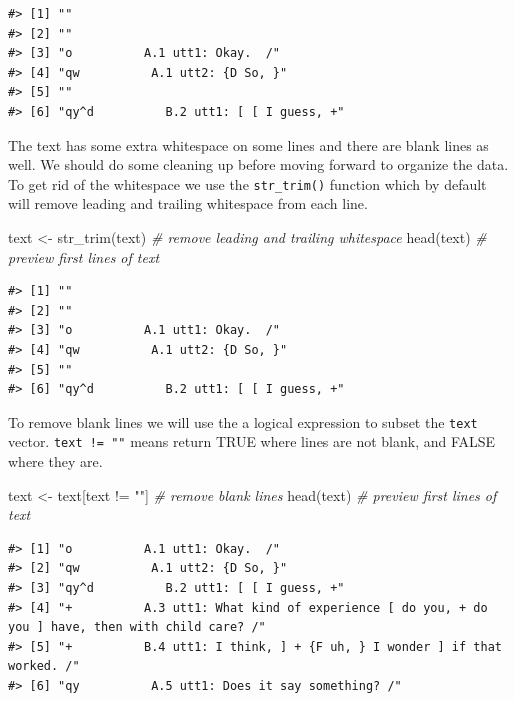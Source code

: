 \documentclass[
  letterpaper,
]{scrbook}
\newenvironment{Shaded}{\begin{snugshade}}{\end{snugshade}}
\newcommand{\CommentTok}[1]{\textcolor[rgb]{0.00,0.00,0.00}{\textit{#1}}}
\newcommand{\FunctionTok}[1]{\textcolor[rgb]{0.00,0.00,0.00}{#1}}
\newcommand{\NormalTok}[1]{\textcolor[rgb]{0.00,0.00,0.00}{#1}}
\newcommand{\OtherTok}[1]{\textcolor[rgb]{0.00,0.00,0.00}{#1}}
\newcommand{\SpecialCharTok}[1]{\textcolor[rgb]{0.00,0.00,0.00}{#1}}
\newcommand{\StringTok}[1]{\textcolor[rgb]{0.00,0.00,0.00}{#1}}
\begin{document}
\begin{verbatim}
#> [1] ""                                      
#> [2] ""                                      
#> [3] "o          A.1 utt1: Okay.  /"         
#> [4] "qw          A.1 utt2: {D So, }"        
#> [5] ""                                      
#> [6] "qy^d          B.2 utt1: [ [ I guess, +"
\end{verbatim}

The text has some extra whitespace on some lines and there are blank
lines as well. We should do some cleaning up before moving forward to
organize the data. To get rid of the whitespace we use the
\texttt{str\_trim()} function which by default will remove leading and
trailing whitespace from each line.

\begin{Shaded}
\begin{Highlighting}[]
\NormalTok{text }\OtherTok{\textless{}{-}} \FunctionTok{str\_trim}\NormalTok{(text) }\CommentTok{\# remove leading and trailing whitespace}
\FunctionTok{head}\NormalTok{(text) }\CommentTok{\# preview first lines of \textasciigrave{}text\textasciigrave{}}
\end{Highlighting}
\end{Shaded}

\begin{verbatim}
#> [1] ""                                      
#> [2] ""                                      
#> [3] "o          A.1 utt1: Okay.  /"         
#> [4] "qw          A.1 utt2: {D So, }"        
#> [5] ""                                      
#> [6] "qy^d          B.2 utt1: [ [ I guess, +"
\end{verbatim}

To remove blank lines we will use the a logical expression to subset the
\texttt{text} vector. \texttt{text\ !=\ ""} means return TRUE where
lines are not blank, and FALSE where they are.

\begin{Shaded}
\begin{Highlighting}[]
\NormalTok{text }\OtherTok{\textless{}{-}}\NormalTok{ text[text }\SpecialCharTok{!=} \StringTok{""}\NormalTok{] }\CommentTok{\# remove blank lines}
\FunctionTok{head}\NormalTok{(text) }\CommentTok{\# preview first lines of \textasciigrave{}text\textasciigrave{}}
\end{Highlighting}
\end{Shaded}

\begin{verbatim}
#> [1] "o          A.1 utt1: Okay.  /"                                                                  
#> [2] "qw          A.1 utt2: {D So, }"                                                                 
#> [3] "qy^d          B.2 utt1: [ [ I guess, +"                                                         
#> [4] "+          A.3 utt1: What kind of experience [ do you, + do you ] have, then with child care? /"
#> [5] "+          B.4 utt1: I think, ] + {F uh, } I wonder ] if that worked. /"                        
#> [6] "qy          A.5 utt1: Does it say something? /"
\end{verbatim}
\end{document}

